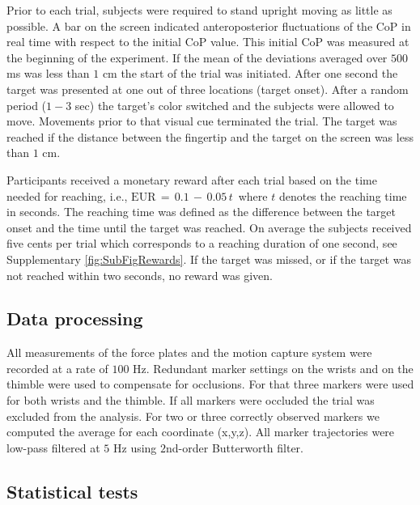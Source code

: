 Prior to each trial, subjects were required to stand upright moving as little as
possible. A bar on the screen indicated anteroposterior fluctuations of the CoP
in real time with respect to the initial CoP value. This initial CoP was measured at the beginning of
the experiment. If the mean of the deviations averaged over $500$ ms was less
than $1$ cm the start of the trial was initiated. After one second the target
was presented at one out of three locations (target onset). After a random
period ($1-3$ sec) the target's color switched and the subjects were allowed to
move. Movements prior to that visual cue terminated the trial. The target was
reached if the distance between the fingertip and the target on the screen was
less than $1$ cm. 

Participants received a monetary reward after each trial based on the time
needed for reaching, i.e., $\textrm{EUR}\,=\,0.1 \, - \, 0.05 \, t\,$ where $t$ denotes the reaching time in seconds. 
The reaching time was defined as the difference between the target onset and the time until the target
was reached. On average the subjects received five cents per trial which corresponds to a reaching duration of one second, see Supplementary \FigureAbbr \ref{fig:SubFigRewards}. %
 If the target was missed, or if the target was not reached within
two seconds, no reward was given. 

\subsection*{Data processing}

All measurements of the force plates and the motion capture system were recorded at a rate of $100$ Hz. Redundant marker settings on the
wrists and on the thimble were used to compensate for occlusions. For that three markers were used 
for both wrists and the thimble. If all markers were occluded the trial was excluded from the analysis. 
For two or three correctly observed markers we computed the average for each coordinate (x,y,z). 
All marker trajectories were low-pass filtered at $5$ Hz using $2$nd-order Butterworth filter.


\subsection*{Statistical tests}

